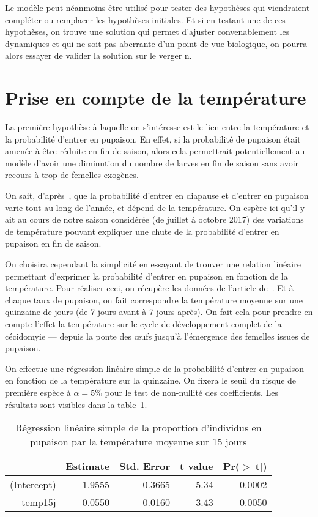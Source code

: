 Le modèle peut néanmoins être utilisé pour tester des hypothèses qui viendraient compléter ou remplacer les hypothèses initiales.
Et si en testant une de ces hypothèses, on trouve une solution qui permet d'ajuster convenablement les dynamiques et qui ne soit pas aberrante d'un point de vue biologique, on pourra alors essayer de valider la solution sur le verger n.


 
 \clearpage

\section{Prise en compte de la température}

La première hypothèse à laquelle on s'intéresse est le lien entre la température et la probabilité d'entrer en pupaison.
En effet, si la probabilité de pupaison était amenée à être réduite en fin de saison, alors cela permettrait potentiellement au modèle d'avoir une diminution du nombre de larves en fin de saison sans avoir recours à trop de femelles exogènes.

On sait, d'après~\citet{pauldiap}, que la probabilité d'entrer en diapause et d'entrer en pupaison varie tout au long de l'année, et dépend de la température.
On espère ici qu'il y ait au cours de notre saison considérée (de juillet à octobre 2017) des variations de température pouvant expliquer une chute de la probabilité d'entrer en pupaison en fin de saison.

On choisira cependant la simplicité en essayant de trouver une relation linéaire permettant d'exprimer la probabilité d'entrer en pupaison en fonction de la température.
Pour réaliser ceci, on récupère les données de l'article de~\citet{pauldiap}.
Et à chaque taux de pupaison, on fait correspondre la température moyenne sur une quinzaine de jours (de 7 jours avant à 7 jours après).
On fait cela pour prendre en compte l'effet la température sur le cycle de développement complet de la cécidomyie --- depuis la ponte des œufs jusqu'à l'émergence des femelles issues de pupaison.


On effectue une régression linéaire simple de la probabilité d'entrer en pupaison en fonction de la température sur la quinzaine.
On fixera le seuil du risque de première espèce à $\alpha = 5\%$ pour le test de non-nullité des coefficients.
Les résultats sont visibles dans la table~\ref{tab:lm2}.

\begin{table}[hb]
\centering
\caption{Régression linéaire simple de la proportion d'individus en pupaison par la température moyenne sur 15 jours}
\label{tab:lm2}
\begin{tabular}{rrrrr}
 & Estimate & Std. Error & t value & Pr($>$$|$t$|$) \\ 
  \hline
(Intercept) & 1.9555 & 0.3665 & 5.34 & 0.0002 \\ 
  temp15j & -0.0550 & 0.0160 & -3.43 & 0.0050 \\ 
\end{tabular}
\end{table}

